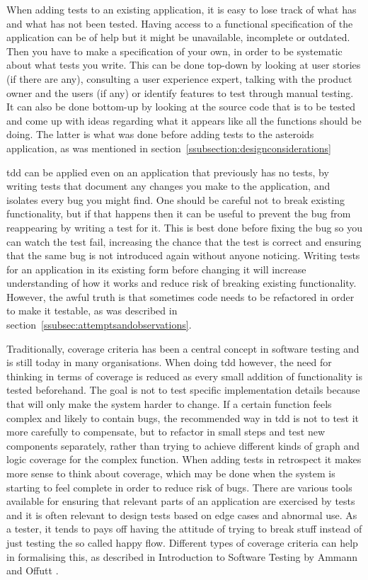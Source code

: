 \documentclass[11pt]{article}
\begin{document}
When adding tests to an existing application, it is easy to lose track of what has and what has not been tested. Having access to a functional specification of the application can be of help but it might be unavailable, incomplete or outdated. Then you have to make a specification of your own, in order to be systematic about what tests you write. This can be done top-down by looking at user stories (if there are any), consulting a user experience expert, talking with the product owner and the users (if any) or identify features to test through manual testing. It can also be done bottom-up by looking at the source code that is to be tested and come up with ideas regarding what it appears like all the functions should be doing. The latter is what was done before adding tests to the asteroids application, as was mentioned in section~\ref{ssubsection:designconsiderations}

\gls{tdd} can be applied even on an application that previously has no tests, by writing tests that document any changes you make to the application, and isolates every bug you might find. One should be careful not to break existing functionality, but if that happens then it can be useful to prevent the bug from reappearing by writing a test for it. This is best done before fixing the bug so you can watch the test fail, increasing the chance that the test is correct and ensuring that the same bug is not introduced again without anyone noticing. Writing tests for an application in its existing form before changing it will increase understanding of how it works and reduce risk of breaking existing functionality. However, the awful truth is that sometimes code needs to be refactored in order to make it testable, as was described in section~\ref{ssubsec:attemptsandobservations}.

Traditionally, coverage criteria has been a central concept in software testing and is still today in many organisations. When doing \gls{tdd} however, the need for thinking in terms of coverage is reduced as every small addition of functionality is tested beforehand. The goal is not to test specific implementation details because that will only make the system harder to change. If a certain function feels complex and likely to contain bugs, the recommended way in \gls{tdd} is not to test it more carefully to compensate, but to refactor in small steps and test new components separately, rather than trying to achieve different kinds of graph and logic coverage for the complex function. When adding tests in retrospect it makes more sense to think about coverage, which may be done when the system is starting to feel complete in order to reduce risk of bugs. There are various tools available for ensuring that relevant parts of an application are exercised by tests and it is often relevant to design tests based on edge cases and abnormal use. As a tester, it tends to pays off having the attitude of trying to break stuff instead of just testing the so called happy flow. Different types of coverage criteria can help in formalising this, as described in Introduction to Software Testing by Ammann and Offutt \cite{AmmannOffutt}.
\end{document}
